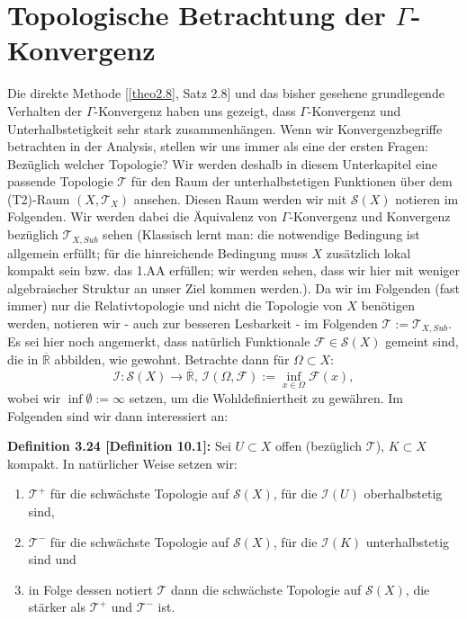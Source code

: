 \section[Topologische Betrachtung der Gamma-Konvergenz]{Topologische Betrachtung der \(\Gamma\)-Konvergenz}{\label{sec:gammatopo}}
Die direkte Methode [\ref{theo2.8}, Satz 2.8] und das bisher gesehene grundlegende Verhalten der \(\Gamma\)-Konvergenz haben uns gezeigt, dass \(\Gamma\)-Konvergenz und Unterhalbstetigkeit sehr stark zusammenhängen. Wenn wir Konvergenzbegriffe betrachten in der Analysis, stellen wir uns immer als eine der ersten Fragen: Bezüglich welcher Topologie? Wir werden deshalb in diesem Unterkapitel eine passende Topologie \(\mathcal{T}\) für den Raum der unterhalbstetigen Funktionen über dem (T2)-Raum \((X,\mathcal{T}_X)\) ansehen. Diesen Raum werden wir mit \(\mathcal{S}(X)\) notieren im Folgenden. Wir werden dabei die Äquivalenz von \(\Gamma\)-Konvergenz und Konvergenz bezüglich \(\mathcal{T}_{X,Sub}\) sehen (Klassisch lernt man: die notwendige Bedingung ist allgemein erfüllt; für die hinreichende Bedingung muss \(X\) zusätzlich lokal kompakt sein bzw. das 1.AA erfüllen; wir werden sehen, dass wir hier mit weniger algebraischer Struktur an unser Ziel kommen werden.). Da wir im Folgenden (fast immer) nur die Relativtopologie und nicht die Topologie von \(X\) benötigen werden, notieren wir - auch zur besseren Lesbarkeit - im Folgenden \(\mathcal{T}:=\mathcal{T}_{X,Sub}\). Es sei hier noch angemerkt, dass natürlich Funktionale \(\mathcal{F} \in \mathcal{S}(X)\) gemeint sind, die in \(\overline{\mathbb{R}}\) abbilden, wie gewohnt. Betrachte dann für \(\Omega \subset X\):
\begin{equation}
    \mathcal{I}:\mathcal{S}(X) \to \overline{\mathbb{R}}, \, \mathcal{I}(\Omega,\mathcal{F}) := \inf_{x \in \Omega} \mathcal{F}(x),
\end{equation}
wobei wir \(\inf \emptyset := \infty\) setzen, um die Wohldefiniertheit zu gewähren. Im Folgenden sind wir dann interessiert an:\\[0.5cm]
\colorbox{generalYellow}{\begin{minipage}{16cm}{\textcolor{black}{}{\label{def3.24}}}
\textbf{Definition 3.24 \cite{MasoGamma}[Definition 10.1]:} Sei \(U \subset X\) offen (bezüglich \(\mathcal{T}\)), \(K \subset X\) kompakt. In natürlicher Weise setzen wir:
\begin{enumerate}
    \item \(\mathcal{T}^+\) für die schwächste Topologie auf \(\mathcal{S}(X)\), für die \(\mathcal{I}(U)\) oberhalbstetig sind,
    \item \(\mathcal{T}^-\) für die schwächste Topologie auf \(\mathcal{S}(X)\), für die \(\mathcal{I}(K)\) unterhalbstetig sind und
    \item in Folge dessen notiert \(\mathcal{T}\) dann die schwächste Topologie auf \(\mathcal{S}(X)\), die stärker als \(\mathcal{T}^+\) und \(\mathcal{T}^-\) ist.
\end{enumerate}
\end{minipage}}

